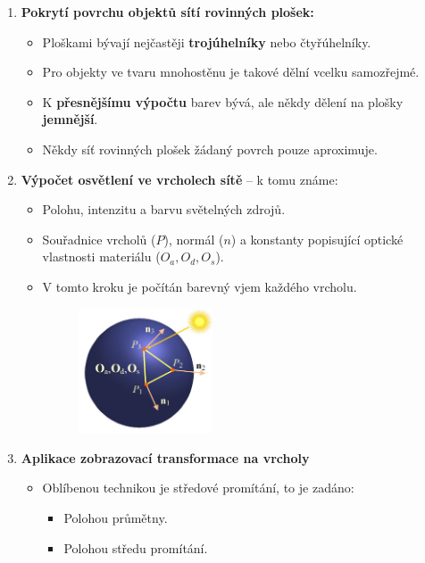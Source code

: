 \begin{enumerate}
	\item  \textbf{Pokrytí povrchu objektů sítí rovinných plošek:}
	\begin{itemize}
		\item Ploškami bývají nejčastěji \textbf{trojúhelníky} nebo čtyřúhelníky.
		\item Pro objekty ve tvaru mnohostěnu je takové dělní vcelku samozřejmé.
		\item K \textbf{přesnějšímu výpočtu }barev bývá, ale někdy dělení na plošky \textbf{jemnější}.
		\item Někdy síť rovinných plošek žádaný povrch pouze aproximuje.
	\end{itemize}
	\item \textbf{Výpočet osvětlení ve vrcholech sítě} -- k tomu známe:
	\begin{itemize}
		\item Polohu, intenzitu a barvu světelných zdrojů.
		\item Souřadnice vrcholů ($P$), normál ($n$) a konstanty popisující optické vlastnosti materiálu ($O_a, O_d, O_s$).
		\item V tomto kroku je počítán barevný vjem každého vrcholu.
		\begin{figure}[H]
		\centering
		\includegraphics[width=0.4\textwidth]{assets/5_vypocet_barevneho_vjemu}
		\end{figure}
	\end{itemize}
	\item \textbf{Aplikace zobrazovací transformace na vrcholy}
	\begin{itemize}
		\item Oblíbenou technikou je středové promítání, to je zadáno:
		\begin{itemize}
			\item Polohou průmětny.
			\item Polohou středu promítání.
		\end{itemize}
		\begin{figure}[H]

\end{figure}
\end{itemize}
\end{enumerate}
